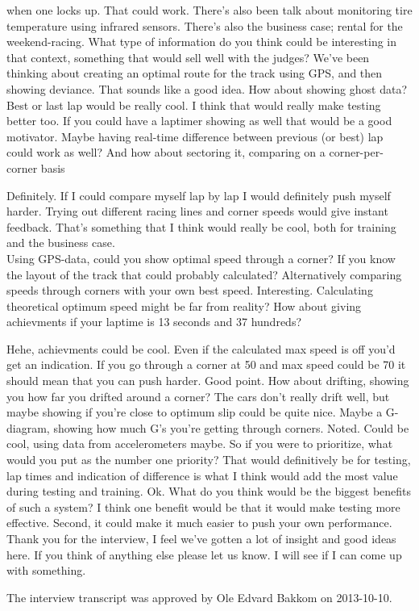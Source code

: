 \begin{dialogue}
    	when one locks up.
     That could work. There's also been talk about monitoring tire temperature using infrared sensors.
     There's also the business case; rental for the weekend-racing. What type of information do you think could be interesting in that
    	context, something that would sell well with the judges? We've been thinking about creating an optimal route for the track using GPS, and then showing deviance.
     That sounds like a good idea. How about showing ghost data? Best or last lap would be really cool. I think that would really make testing better too. 
    	If you could have a laptimer showing as well that would be a good motivator. 
     Maybe having real-time difference between previous (or best) lap could work as well? And how about sectoring it, comparing on a corner-per-corner basis
    	 
     Definitely. If I could compare myself lap by lap I would definitely push myself harder. Trying out different racing lines and corner speeds would give 
    	instant feedback. That's something that I think would really be cool, both for training and the business case.\\
    	Using GPS-data, could you show optimal speed through a corner? If you know the layout of the track that could probably calculated? Alternatively comparing speeds through
    	corners with your own best speed. 
     Interesting. Calculating theoretical optimum speed might be far from reality? How about giving achievments if your laptime is 13 seconds and 37 hundreds?
    	
     Hehe, achievments could be cool. Even if the calculated max speed is off you'd get an indication. If you go through a corner at 50 and max speed 
    	could be 70 it should mean that you can push harder.
     Good point. How about drifting, showing you how far you drifted around a corner?
     The cars don't really drift well, but maybe showing if you're close to optimum slip could be quite nice. Maybe a G-diagram, 
    	showing how much G's you're getting through corners. 
     Noted. Could be cool, using data from accelerometers maybe. So if you were to prioritize, what would you put as the number one
    	priority? 
     That would definitively be for testing, lap times and indication of difference is what I think would add the most value during testing and training.
     Ok. What do you think would be the biggest benefits of such a system?
     I think one benefit would be that it would make testing more effective. Second, it could make it much easier to push your own performance. 
     Thank you for the interview, I feel we've gotten a lot of insight and good ideas here. If you think of anything else please let us know. 
     I will see if I can come up with something. 
    
  \end{dialogue} 


  The interview transcript was approved by Ole Edvard Bakkom on 2013-10-10.
